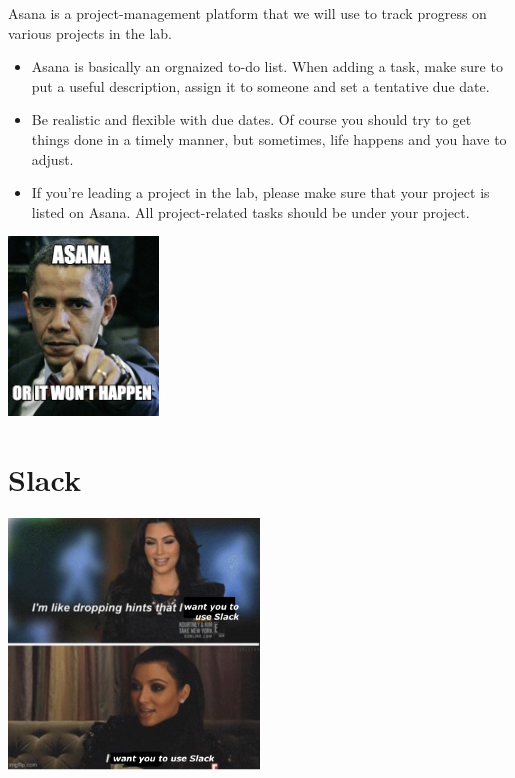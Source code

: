 \documentclass[
]{book}
\providecommand{\tightlist}{%
  \setlength{\itemsep}{0pt}\setlength{\parskip}{0pt}}
\begin{document}
Asana is a project-management platform that we will use to track progress on various projects in the lab.

\begin{itemize}
\tightlist
\item
  Asana is basically an orgnaized to-do list. When adding a task, make sure to put a useful description, assign it to someone and set a tentative due date.\\
\item
  Be realistic and flexible with due dates. Of course you should try to get things done in a timely manner, but sometimes, life happens and you have to adjust.\\
\item
  If you're leading a project in the lab, please make sure that your project is listed on Asana. All project-related tasks should be under your project.
\end{itemize}

\includegraphics[width=0.3\textwidth,height=\textheight]{images/asana.jpg}

\hypertarget{slack}{%
\section{Slack}\label{slack}}

\includegraphics[width=0.5\textwidth,height=\textheight]{images/dropping_hints_slack.jpg}
\end{document}
